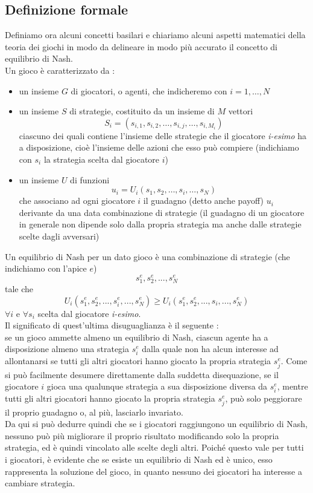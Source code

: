 \subsection{Definizione formale}
\justify
Definiamo ora alcuni concetti basilari e chiariamo alcuni aspetti matematici della teoria dei giochi in modo da delineare in modo più accurato il concetto di equilibrio di Nash.\\
Un gioco è caratterizzato da :

\begin{itemize}
	\item un insieme \(G\) di giocatori, o agenti, che indicheremo con \(i = 1,\ldots,N\)
	\item un insieme \(S\) di strategie, costituito da un insieme di \(M\) vettori \[S_{i}=\left(s_{{i,1}},s_{{i,2}},\ldots,s_{{i,j}},\ldots,s_{{i,M_{i}}}\right)\] ciascuno dei quali contiene l'insieme delle strategie che il giocatore \textit{i-esimo} ha a disposizione, cioè l'insieme delle azioni che esso può compiere (indichiamo con \(s_i\) la strategia scelta dal giocatore \(i\))
	\item un insieme \(U\) di funzioni \[u_{i}=U_{i}\left(s_{1},s_{2},\ldots,s_{i},\ldots,s_{N}\right)\] che associano ad ogni giocatore \(i\) il guadagno (detto anche payoff) \(u_i\) derivante da una data combinazione di strategie (il guadagno di un giocatore in generale non dipende solo dalla propria strategia ma anche dalle strategie scelte dagli avversari)
\end{itemize}

Un equilibrio di Nash per un dato gioco è una combinazione di strategie (che indichiamo con l'apice \(e\))
\[s_{1}^{e},s_{2}^{e},...,s_{N}^{e}\]
tale che
\[U_{i}\left(s_{1}^{e},s_{2}^{e},...,s_{i}^{e},...,s_{N}^{e}\right)\geq U_{i}\left(s_{1}^{e},s_{2}^{e},...,s_{i},...,s_{N}^{e}\right)\]
\(\forall i\) e \(\forall s_i\) scelta dal giocatore \textit{i-esimo}.\\
Il significato di quest'ultima disuguaglianza è il seguente : \\
se un gioco ammette almeno un equilibrio di Nash, ciascun agente ha a disposizione almeno una strategia \(s_i^e\) dalla quale non ha alcun interesse ad allontanarsi se tutti gli altri giocatori hanno giocato la propria strategia \(s_j^e\). Come si può facilmente desumere direttamente dalla suddetta disequazione, se il giocatore \(i\) gioca una qualunque strategia a sua disposizione diversa da \(s_i^e\), mentre tutti gli altri giocatori hanno giocato la propria strategia \(s_j^e\), può solo peggiorare il proprio guadagno o, al più, lasciarlo invariato.\\
Da qui si può dedurre quindi che se i giocatori raggiungono un equilibrio di Nash, nessuno può più migliorare il proprio risultato modificando solo la propria strategia, ed è quindi vincolato alle scelte degli altri. Poiché questo vale per tutti i giocatori, è evidente che se esiste un equilibrio di Nash ed è unico, esso rappresenta la soluzione del gioco, in quanto nessuno dei giocatori ha interesse a cambiare strategia.\\


